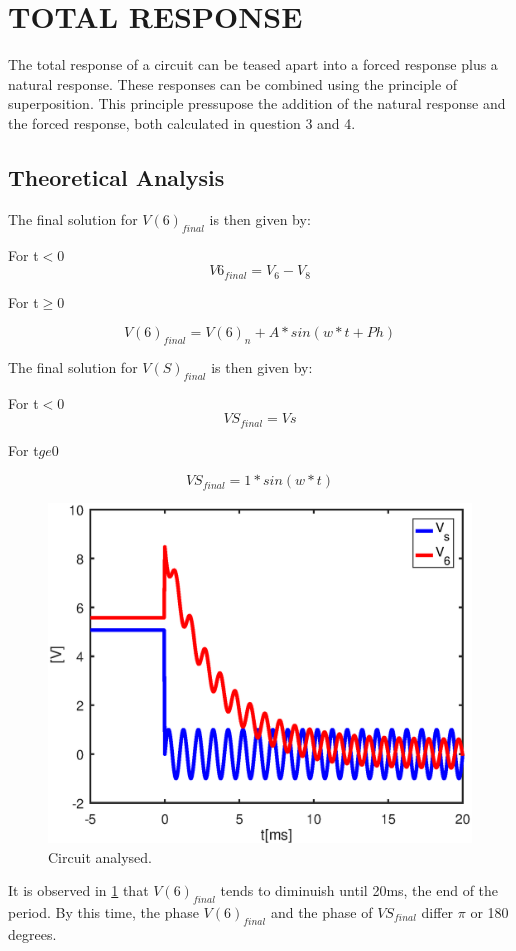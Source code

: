 \section{TOTAL RESPONSE}

The total response of a circuit can be teased apart into a forced response plus a natural response. These responses can be combined using the principle of superposition. This principle pressupose the addition of the natural response and the forced response, both calculated in question 3 and 4.

\subsection{Theoretical Analysis}
The final solution for $V(6)_{final}$  is then given by:
\par For t$<$0
\begin{equation}
V6_{final}=V_{6}-V_{8}
\end{equation}
\par For t$\ge$0

\begin{equation}
V(6)_{final}=V(6)_{n} + A*sin(w*t+Ph)
\end{equation}

The final solution for $V(S)_{final}$  is then given by:
\par For t$<$0
\begin{equation}
VS_{final}=Vs
\end{equation}
\par For t$ge$0

\begin{equation}
VS_{final}=1*sin(w*t)
\end{equation}

\begin{figure}[h] \centering
\includegraphics[width=0.5\linewidth]{part4.eps}
\caption{Circuit analysed.}
\label{fig:part4}
\end{figure}

\par It is observed in \ref{fig:part4} that $V(6)_{final}$ tends to diminuish  until 20ms, the end of the period. By this time, the phase $V(6)_{final}$ and the phase of  $VS_{final}$ differ $\pi$ or 180 degrees.


